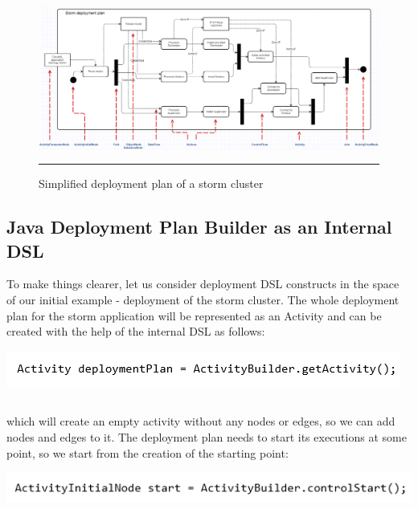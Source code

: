 \begin{figure}[htbp]
	\centering
		\includegraphics[width=38em]{./Figures/DSL_examplified}
		\rule{38em}{0.5pt}
	\caption[Storm Cluster Simplified Plan]{Simplified deployment plan of a storm cluster}
	\label{fig:simplified}
\end{figure}

\subsection{Java Deployment Plan Builder as an Internal DSL}

\noindent To make things clearer, let us consider deployment DSL constructs in the space of our initial example - deployment of the storm cluster. The whole deployment plan for the storm application will be represented as an Activity and can be created with the help of the internal DSL as follows:

\begin{center}
	\includegraphics{./Figures/Get}
	\begin{lstlisting}[mathescape,caption={Deployment plan declaration},label={lst:3}]
	\end{lstlisting}
\end{center}

\noindent which will create an empty activity without any nodes or edges, so we can add nodes and edges to it. The deployment plan needs to start its executions at some point, so we start from the creation of the starting point:

\begin{center}
	\includegraphics{./Figures/Start}
	\begin{lstlisting}[mathescape,caption={Activity initial node},label={lst:4}]
	\end{lstlisting}
\end{center}


